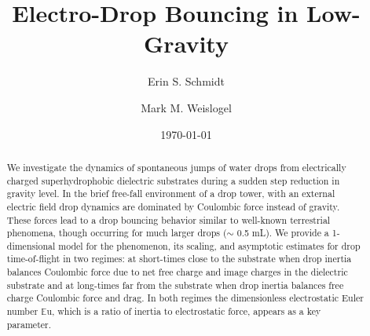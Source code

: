 \documentclass[aip,reprint, floatfix]{revtex4-1}
\begin{document}
\newcommand{\redline}{\raisebox{2pt}{\tikz{\draw[-,red,solid,line width = 1.5pt](0,0) -- (5mm,0);}}}
\graphicspath{ {../figures/} }

\newcommand{\blueline}{\raisebox{2pt}{\tikz{\draw[-,blue,solid,line width = 1.5pt](0,0) -- (5mm,0);}}}
\graphicspath{ {../figures/} }

\newcommand{\cyanline}{\raisebox{2pt}{\tikz{\draw[-,cyan,solid,line width = 1.5pt](0,0) -- (5mm,0);}}}
\graphicspath{ {../figures/} }


\title{Electro-Drop Bouncing in Low-Gravity} %



\author{Erin S. Schmidt}

\author{Mark M. Weislogel}


\date{\today}

\begin{abstract}

We investigate the dynamics of spontaneous jumps of water drops from electrically charged superhydrophobic dielectric substrates during a sudden step reduction in gravity level. In the brief free-fall environment of a drop tower, with an external electric field drop dynamics are dominated by Coulombic force instead of gravity. These forces lead to a drop bouncing behavior similar to well-known terrestrial phenomena, though occurring for much larger drops ($\sim$ 0.5 mL). We provide a 1-dimensional model for the phenomenon, its scaling, and asymptotic estimates for drop time-of-flight in two regimes: at short-times close to the substrate when drop inertia balances Coulombic force due to net free charge and image charges in the dielectric substrate and at long-times far from the substrate when drop inertia balances free charge Coulombic force and drag. In both regimes the dimensionless electrostatic Euler number $\mathbb{E}\mbox{u}$, which is a ratio of inertia to electrostatic force, appears as a key parameter.
\end{abstract}
\end{document}
